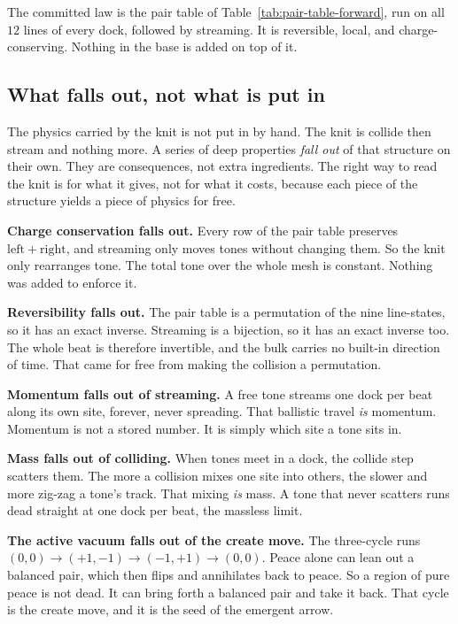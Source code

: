 \begin{principle}
The committed law is the pair table of Table~\ref{tab:pair-table-forward}, run on all $12$ lines of every dock, followed by streaming. It is reversible, local, and charge-conserving. Nothing in the base is added on top of it.
\end{principle}

\subsection{What falls out, not what is put in}

The physics carried by the knit is not put in by hand. The knit is collide then stream and nothing more. A series of deep properties \emph{fall out} of that structure on their own. They are consequences, not extra ingredients. The right way to read the knit is for what it gives, not for what it costs, because each piece of the structure yields a piece of physics for free.

\textbf{Charge conservation falls out.} Every row of the pair table preserves $\mathrm{left} + \mathrm{right}$, and streaming only moves tones without changing them. So the knit only rearranges tone. The total tone over the whole mesh is constant. Nothing was added to enforce it.

\textbf{Reversibility falls out.} The pair table is a permutation of the nine line-states, so it has an exact inverse. Streaming is a bijection, so it has an exact inverse too. The whole beat is therefore invertible, and the bulk carries no built-in direction of time. That came for free from making the collision a permutation.

\textbf{Momentum falls out of streaming.} A free tone streams one dock per beat along its own site, forever, never spreading. That ballistic travel \emph{is} momentum. Momentum is not a stored number. It is simply which site a tone sits in.

\textbf{Mass falls out of colliding.} When tones meet in a dock, the collide step scatters them. The more a collision mixes one site into others, the slower and more zig-zag a tone's track. That mixing \emph{is} mass. A tone that never scatters runs dead straight at one dock per beat, the massless limit.

\textbf{The active vacuum falls out of the create move.} The three-cycle runs $(0,0) \to (+1,-1) \to (-1,+1) \to (0,0)$. Peace alone can lean out a balanced pair, which then flips and annihilates back to peace. So a region of pure peace is not dead. It can bring forth a balanced pair and take it back. That cycle is the create move, and it is the seed of the emergent arrow.

